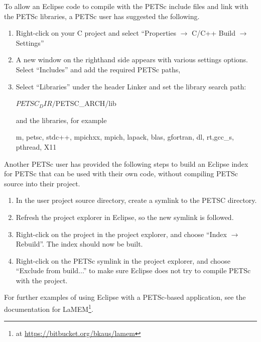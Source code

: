 {{To allow an Eclipse code to compile with the PETSc include files and link with the PETSc libraries, a PETSc user has suggested the following.
\begin{enumerate}
  \item Right-click on your C project and select ``Properties $\rightarrow$ C/C++ Build $\rightarrow$ Settings''
\item A new window on the righthand side appears with various settings options.
Select ``Includes'' and add the required PETSc paths,
\item Select ``Libraries'' under the header Linker
and set the library search path:
\begin{bashlisting}
${PETSC_DIR}/${PETSC_ARCH}/lib
\end{bashlisting}
and the libraries, for example
\begin{bashlisting}
m, petsc, stdc++, mpichxx, mpich, lapack, blas, gfortran, dl, rt,gcc_s, pthread, X11
\end{bashlisting}
\end{enumerate}
Another PETSc user has provided the following steps to build an Eclipse index for PETSc that can be used with their own code, without compiling PETSc source into their project.
\begin{enumerate}
\item In the user project source directory, create a symlink to the PETSC  directory.
\item Refresh the project explorer in Eclipse, so the new symlink is followed.
\item Right-click on the project in the project explorer, and choose ``Index $\rightarrow$ Rebuild''. The index should now be built.
\item Right-click on the PETSc symlink in the project explorer, and choose ``Exclude from build...'' to make sure Eclipse does not try to compile PETSc with the project.
\end{enumerate}
For further examples of using Eclipse with a PETSc-based application, see the documentation for LaMEM\footnote{ at \url{https://bitbucket.org/bkaus/lamem}}.

}}
